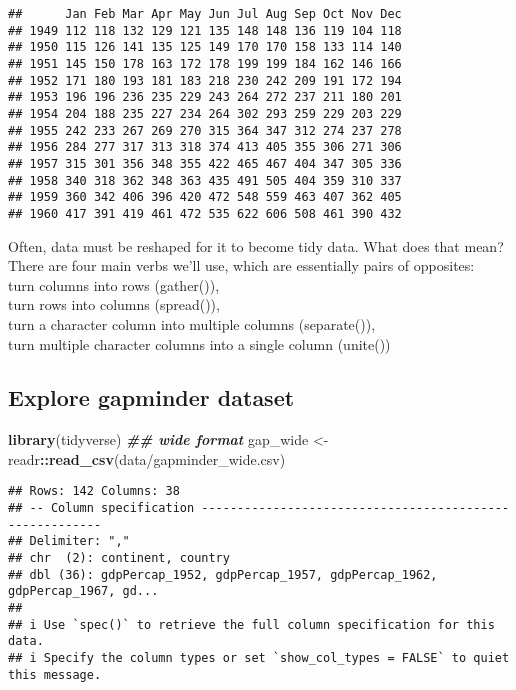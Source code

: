 \documentclass[
]{article}
\newenvironment{Shaded}{\begin{snugshade}}{\end{snugshade}}
\newcommand{\DocumentationTok}[1]{\textcolor[rgb]{0.56,0.35,0.01}{\textbf{\textit{#1}}}}
\newcommand{\FunctionTok}[1]{\textcolor[rgb]{0.13,0.29,0.53}{\textbf{#1}}}
\newcommand{\NormalTok}[1]{#1}
\newcommand{\OtherTok}[1]{\textcolor[rgb]{0.56,0.35,0.01}{#1}}
\newcommand{\SpecialCharTok}[1]{\textcolor[rgb]{0.81,0.36,0.00}{\textbf{#1}}}
\newcommand{\StringTok}[1]{\textcolor[rgb]{0.31,0.60,0.02}{#1}}
\begin{document}
\begin{verbatim}
##      Jan Feb Mar Apr May Jun Jul Aug Sep Oct Nov Dec
## 1949 112 118 132 129 121 135 148 148 136 119 104 118
## 1950 115 126 141 135 125 149 170 170 158 133 114 140
## 1951 145 150 178 163 172 178 199 199 184 162 146 166
## 1952 171 180 193 181 183 218 230 242 209 191 172 194
## 1953 196 196 236 235 229 243 264 272 237 211 180 201
## 1954 204 188 235 227 234 264 302 293 259 229 203 229
## 1955 242 233 267 269 270 315 364 347 312 274 237 278
## 1956 284 277 317 313 318 374 413 405 355 306 271 306
## 1957 315 301 356 348 355 422 465 467 404 347 305 336
## 1958 340 318 362 348 363 435 491 505 404 359 310 337
## 1959 360 342 406 396 420 472 548 559 463 407 362 405
## 1960 417 391 419 461 472 535 622 606 508 461 390 432
\end{verbatim}

Often, data must be reshaped for it to become tidy data. What does that
mean? There are four main verbs we'll use, which are essentially pairs
of opposites:\\
turn columns into rows (gather()),\\
turn rows into columns (spread()),\\
turn a character column into multiple columns (separate()),\\
turn multiple character columns into a single column (unite())\\

\subsection{Explore gapminder dataset}\label{explore-gapminder-dataset}

\begin{Shaded}
\begin{Highlighting}[]
\FunctionTok{library}\NormalTok{(tidyverse)}
\DocumentationTok{\#\# wide format}
\NormalTok{gap\_wide }\OtherTok{\textless{}{-}}\NormalTok{ readr}\SpecialCharTok{::}\FunctionTok{read\_csv}\NormalTok{(}\StringTok{\textquotesingle{}data/gapminder\_wide.csv\textquotesingle{}}\NormalTok{)}
\end{Highlighting}
\end{Shaded}

\begin{verbatim}
## Rows: 142 Columns: 38
## -- Column specification --------------------------------------------------------
## Delimiter: ","
## chr  (2): continent, country
## dbl (36): gdpPercap_1952, gdpPercap_1957, gdpPercap_1962, gdpPercap_1967, gd...
## 
## i Use `spec()` to retrieve the full column specification for this data.
## i Specify the column types or set `show_col_types = FALSE` to quiet this message.
\end{verbatim}
\end{document}
